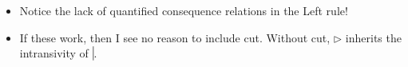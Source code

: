 \documentclass{article}
\newcommand{\nc}{\turnstile{s}{w}{}{}{n}}
\begin{document}
\begin{itemize}
\item Notice the lack of quantified consequence relations in the Left rule!
\item If these work, then I see no reason to include cut. Without cut, $ \rhd $ inherits the intransivity of $ \nc $.
\vspace{3cm}

%
%
%  
%  
%    
%    


\end{itemize}
\end{document}
